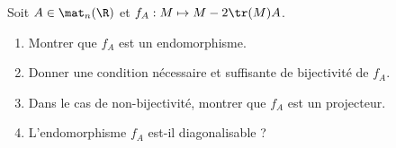 \begin{enonce}
\begin{exercise}[ID={RMS135 E1420},subtitle={IMT MP 2024},tags={},difficulty={}]
Soit $A \in \mat_n(\R)$ et $f_A : M \mapsto M - 2 \tr(M) A$.
\begin{enumerate}
  \item Montrer que $f_A$ est un endomorphisme.
  \item Donner une condition nécessaire et suffisante de bijectivité de $f_A$.
  \item Dans le cas de non-bijectivité, montrer que $f_A$ est un projecteur.
  \item L'endomorphisme $f_A$ est-il diagonalisable ?
\end{enumerate}
\end{exercise}
\begin{solution}
\end{solution}
\end{enonce}
